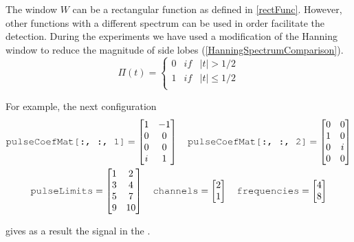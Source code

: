 The window $W$ can be a rectangular function as defined in \autoref{rectFunc}. However, other functions with a different spectrum can be used in order facilitate the detection. During the experiments we have used a modification of the Hanning window to reduce the magnitude of side lobes (\autoref{HanningSpectrumComparison}).
\begin{equation}
\Pi(t) = \left\{ \begin{array}{lcc}
0 &   if  & |t| > 1/2 \\
1 &  if & |t| \leq 1/2 \\
\end{array} \right.
\label{rectFunc}
\end{equation}


For example, the next configuration
\begin{gather*}
\text{\variable{pulseCoefMat[:, :, 1]}} = 
\begin{bmatrix}
	1 & -1 \\
	0 & 0 \\
	0 & 0 \\
	i & 1 \\
\end{bmatrix}
\quad
\text{\variable{pulseCoefMat[:, :, 2]}} = 
\begin{bmatrix}
	0 & 0 \\
	1 & 0 \\
	0 & i \\
	0 & 0 \\
\end{bmatrix}\\
\text{\variable{pulseLimits}} =
\begin{bmatrix}
	1 & 2 \\
	3 & 4 \\
	5 & 7 \\
	9 & 10 \\
\end{bmatrix}
\quad
\text{\variable{channels}} =
\begin{bmatrix}
	2 \\
	1 \\
\end{bmatrix}
\quad
\text{\variable{frequencies}} =
\begin{bmatrix}
	4 \\
	8 \\
\end{bmatrix}
\end{gather*}

gives as a result the signal in the .

